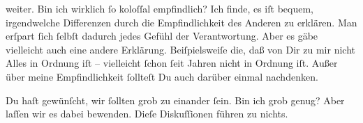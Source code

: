                weiter. Bin ich wirklich{ }ſo koloſſal empfindlich? Ich finde, es iſt bequem,  irgendwelche
               Differenzen durch die Empfindlichkeit des Anderen zu erklären. Man erſpart{ }ſich{ }ſelbſt dadurch jedes Gefühl der Verantwortung. Aber es gäbe vielleicht auch eine
               andere Erklärung. Beiſpielsweiſe die, daß von Dir zu mir nicht Alles in Ordnung iſt –
               vielleicht{ }ſchon{ }ſeit Jahren nicht in Ordnung iſt. Außer über meine Empfindlichkeit{ }ſollteſt Du auch darüber einmal nachdenken.\pend
           
\pstart
           Du haſt gewünſcht, wir{ }ſollten grob zu einander{ }ſein. Bin ich grob genug? Aber laſſen
               wir es dabei {\pb}bewenden. Dieſe Diskuſſionen führen zu
               nichts.\pend
           
